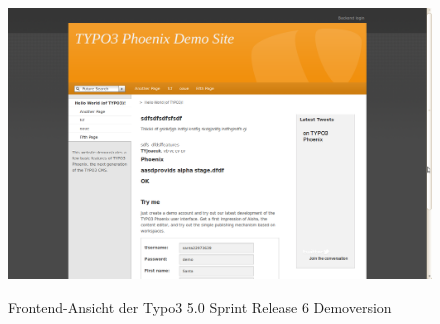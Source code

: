 \begin{figure}[!h]
\begin{center}
\label{fig.typo3frontend}
\includegraphics[scale=0.239]{images/typo3/frontend.png}
\caption{Frontend-Ansicht der Typo3 5.0 Sprint Release 6 Demoversion}
\end{center}
\end{figure}


